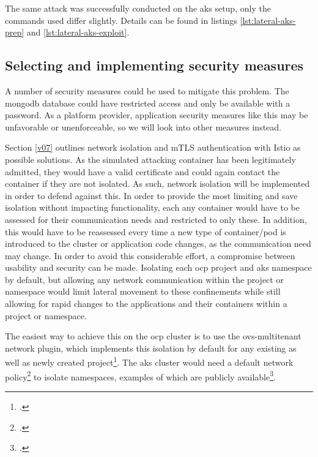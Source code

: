 The same attack was successfully conducted on the \gls{aks} setup, only the commands used differ slightly. Details can be found in listings \ref{lst:lateral-aks-prep} and \ref{lst:lateral-aks-exploit}.

\subsection{Selecting and implementing security measures}

A number of security measures could be used to mitigate this problem.
The mongodb database could have restricted access and only be available with a password. 
As a platform provider, application security measures like this may be unfavorable or unenforceable, so we will look into other measures instead.

Section \ref{v07} outlines network isolation and mTLS authentication with Istio as possible solutions. As the simulated attacking container has been legitimately admitted, they would have a valid certificate and could again contact the container if they are not isolated. As such, network isolation will be implemented in order to defend against this.
In order to provide the most limiting and save isolation without impacting functionality, each any container would have to be assessed for their communication needs and restricted to only these. In addition, this would have to be reassessed every time a new type of container/pod is introduced to the cluster or application code changes, as the communication need may change. In order to avoid this considerable effort, a compromise between usability and security can be made. Isolating each \gls{ocp} project and \gls{aks} namespace by default, but allowing any network communication within the project or namespace would limit lateral movement to these confinements while still allowing for rapid changes to the applications and their containers within a project or namespace. 

The easiest way to achieve this on the \gls{ocp} cluster is to use the ovs-multitenant network plugin, which implements this isolation by default for any existing as well as newly created project\footcite[][, section 'Overview']{ocpNetworkPlugins}. The \gls{aks} cluster would need a default network policy\footcite[][, section 'Default Policies']{egressNetPol} to isolate namespaces, examples of which are publicly available\footcite[][, section 'Example']{netPolExample}.

